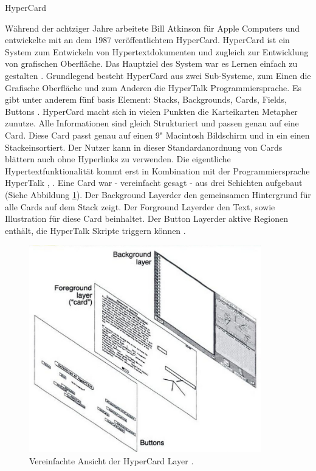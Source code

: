 \begin{section}{HyperCard}
\label{sec:hypercard}

Während der achtziger Jahre arbeitete Bill Atkinson für Apple Computers und entwickelte mit an dem 1987 veröffentlichtem HyperCard. HyperCard ist ein System zum Entwickeln von Hypertextdokumenten und zugleich zur Entwicklung von grafischen Oberfläche. Das Hauptziel des System war es Lernen einfach zu gestalten \cite{Nielsen1991}. Grundlegend besteht HyperCard aus zwei Sub-Systeme, zum Einen die Grafische Oberfläche und zum Anderen die HyperTalk Programmiersprache. Es gibt unter anderem fünf basis Element: Stacks, Backgrounds, Cards, Fields, Buttons \cite{Goodman1988}. HyperCard macht sich in vielen Punkten die Karteikarten Metapher zunutze. Alle Informationen sind gleich Strukturiert und passen genau auf eine \glqq Card\grqq{ }. Diese Card passt genau auf einen 9" Macintosh Bildschirm und in ein einen \glqq Stack\grqq{ }einsortiert. Der Nutzer kann in dieser Standardanordnung von Cards blättern auch ohne Hyperlinks zu verwenden. Die eigentliche Hypertextfunktionalität kommt erst in Kombination mit der Programmiersprache HyperTalk \cite{Goodman1988}, \cite{Nielsen1991}. Eine Card war - vereinfacht gesagt - aus drei Schichten aufgebaut (Siehe Abbildung \ref{fig:layer}). Der \glqq Background Layer\grqq{ }der den gemeinsamen Hintergrund für alle Cards auf dem Stack zeigt. Der \glqq Forground Layer\grqq{ }der den Text, sowie Illustration für diese Card beinhaltet. Der \glqq Button Layer\grqq{ }der aktive Regionen enthält, die HyperTalk Skripte triggern können \cite{Nielsen1995}.

\begin{figure}[!ht]
	\centering
	\includegraphics[width=0.9\textwidth]{image/layer}
	\caption{Vereinfachte Ansicht der HyperCard Layer \cite{Nielsen1995}.}
	\label{fig:layer}
\end{figure}


\end{section}
